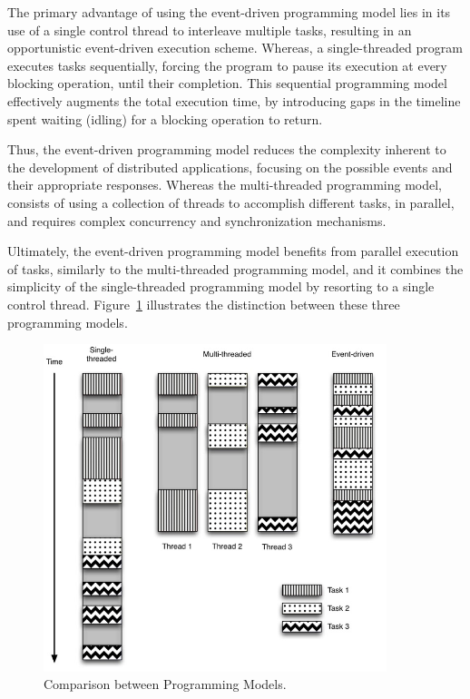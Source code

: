 \documentclass[12pt, titlepage]{uo_temp}
\begin{document}
     The primary advantage of using the event-driven programming model lies in its use of
     a single control thread to interleave multiple tasks, resulting in an opportunistic
     event-driven execution scheme. Whereas, a single-threaded program executes tasks
     sequentially, forcing the program to pause its execution at every blocking operation,
     until their completion. This sequential programming model effectively augments the
     total execution time, by introducing gaps in the timeline spent waiting (idling) for
     a blocking operation to return.

     Thus, the event-driven programming model reduces the complexity inherent to the
     development of distributed applications, focusing on the possible events and their
     appropriate responses. Whereas the multi-threaded programming model, consists of
     using a collection of threads to accomplish different tasks, in parallel, and
     requires complex concurrency and synchronization mechanisms. 

     Ultimately, the event-driven programming model benefits from parallel execution of
     tasks, similarly to the multi-threaded programming model, and it combines the
     simplicity of the single-threaded programming model by resorting to a single control
     thread. Figure~\ref{multi} illustrates the distinction between these three programming
     models.

     \begin{figure}[h]
       \centering
       \includegraphics[width=100mm]{images/twisted_multi.jpg}
       \caption{Comparison between Programming Models. \cite{mckellar2013twisted}}\label{multi}
     \end{figure}
\end{document}
